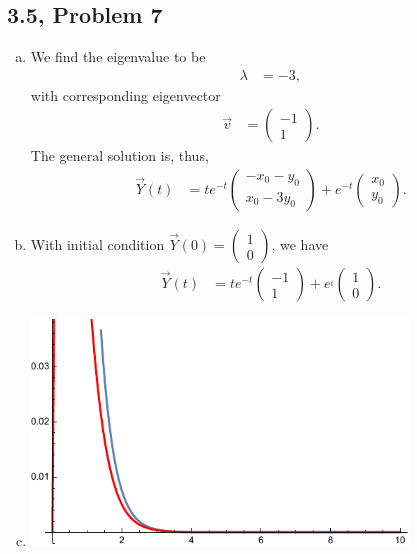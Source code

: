 \documentclass[10pt]{mypackage}
\begin{document}
\subsection{3.5, Problem 7}%
\begin{enumerate}[(a)]
  \item We find the eigenvalue to be
    \begin{align*}
      \lambda &= -3,
    \end{align*}
    with corresponding eigenvector
    \begin{align*}
      \vec{v} &= \begin{pmatrix}-1\\1\end{pmatrix}.
    \end{align*}
    The general solution is, thus,
    \begin{align*}
      \vec{Y}(t) &= te^{-t} \begin{pmatrix}-x_0 - y_0 \\ x_0-3y_0\end{pmatrix} + e^{-t} \begin{pmatrix}x_0\\y_0\end{pmatrix}.
    \end{align*}
  \item With initial condition $\vec{Y}(0) = \begin{pmatrix}1\\0\end{pmatrix}$, we have
    \begin{align*}
      \vec{Y}(t) &= te^{-t} \begin{pmatrix}-1\\1\end{pmatrix} + e^{_t} \begin{pmatrix}1\\0\end{pmatrix}.
    \end{align*}
  \item \hfill
    \begin{center}
      \includegraphics[width=10cm]{images/3_5_7c.pdf}
    \end{center}
\end{enumerate}
\end{document}
